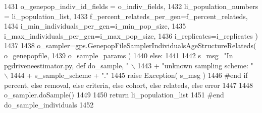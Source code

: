 \begin{DoxyCode}
1431                                         o\_genepop\_indiv\_id\_fields = o\_indiv\_fields,
1432                                         li\_population\_numbers = li\_population\_list,
1433                                         f\_percent\_relateds\_per\_gen=f\_percent\_relateds,
1434                                         i\_min\_individuals\_per\_gen=i\_min\_pop\_size,
1435                                         i\_max\_individuals\_per\_gen=i\_max\_pop\_size,
1436                                         i\_replicates=i\_replicates )
1437 
1438             o\_sampler=gps.GenepopFileSamplerIndividualsAgeStructureRelateds( o\_genepopfile,
1439                                                                     o\_sample\_params )
1440     \textcolor{keywordflow}{else}:
1441 
1442         s\_msg=\textcolor{stringliteral}{"In pgdriveneestimator.py, def do\_sample, "} \(\backslash\)
1443                 + \textcolor{stringliteral}{"unknown sampling scheme: "} \(\backslash\)
1444                 + s\_sample\_scheme + \textcolor{stringliteral}{"."}
1445         \textcolor{keywordflow}{raise} Exception( s\_msg )
1446     \textcolor{comment}{#end if percent, else removal, else criteria, else cohort, else relateds, else error}
1447 
1448     o\_sampler.doSample()
1449 
1450     \textcolor{keywordflow}{return} li\_population\_list
1451 \textcolor{comment}{#end do\_sample\_individuals}
1452 
\end{DoxyCode}
